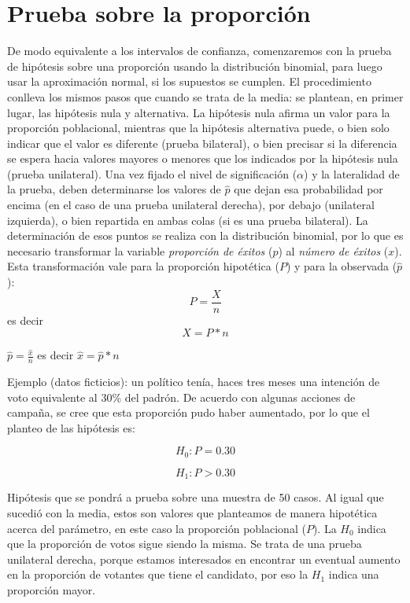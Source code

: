 \documentclass[]{book}
\begin{document}
\hypertarget{prueba-sobre-la-proporciuxf3n}{%
\section{Prueba sobre la proporción}\label{prueba-sobre-la-proporciuxf3n}}

De modo equivalente a los intervalos de confianza, comenzaremos con la
prueba de hipótesis sobre una proporción usando la distribución
binomial, para luego usar la aproximación normal, si los supuestos se
cumplen. El procedimiento conlleva los mismos pasos que cuando se trata
de la media: se plantean, en primer lugar, las hipótesis nula y
alternativa. La hipótesis nula afirma un valor para la proporción
poblacional, mientras que la hipótesis alternativa puede, o bien solo
indicar que el valor es diferente (prueba bilateral), o bien precisar si
la diferencia se espera hacia valores mayores o menores que los
indicados por la hipótesis nula (prueba unilateral). Una vez fijado el
nivel de significación (\(\alpha\)) y la lateralidad de la prueba, deben
determinarse los valores de \(\widehat{p}\) que dejan esa probabilidad por
encima (en el caso de una prueba unilateral derecha), por debajo
(unilateral izquierda), o bien repartida en ambas colas (si es una
prueba bilateral). La determinación de esos puntos se realiza con la
distribución binomial, por lo que es necesario transformar la variable
\emph{proporción de éxitos} (\(p\)) al \emph{número de éxitos} (\(x\)). Esta
transformación vale para la proporción hipotética (\(P\)) y para la
observada (\(\widehat{p}\)): \[P = \frac{X}{n}\] es decir \[X = P*n\]

\(\widehat{p} = \frac{\widehat{x}}{n}\) es decir
\(\widehat{x} = \widehat{p}*n\)

Ejemplo (datos ficticios): un político tenía, haces tres meses una
intención de voto equivalente al 30\% del padrón. De acuerdo con algunas
acciones de campaña, se cree que esta proporción pudo haber aumentado,
por lo que el planteo de las hipótesis es:

\[H_{0}:P = 0.30\]

\[H_{1}:P > 0.30\]

Hipótesis que se pondrá a prueba sobre una muestra de 50 casos. Al igual
que sucedió con la media, estos son valores que planteamos de manera
hipotética acerca del parámetro, en este caso la proporción poblacional
(\(P\)). La \(H_{0}\) indica que la proporción de votos sigue siendo la misma.
Se trata de una prueba unilateral derecha, porque estamos interesados en
encontrar un eventual aumento en la proporción de votantes que tiene el
candidato, por eso la \(H_{1}\) indica una proporción mayor.
\end{document}
